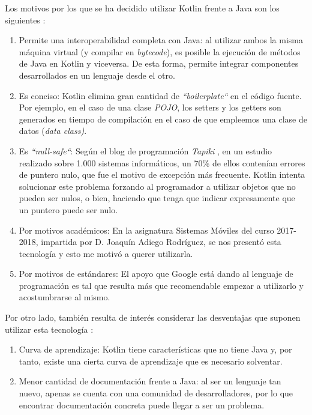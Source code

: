 \documentclass[twoside]{report}
\begin{document}
Los motivos por los que se ha decidido utilizar Kotlin frente a Java son los siguientes \cite{kotlin}:
\begin{enumerate}

\item Permite una interoperabilidad completa con Java: al utilizar ambos la misma máquina virtual (y compilar en \textit{bytecode}), es posible la ejecución de métodos de Java en Kotlin y viceversa. De esta forma, permite integrar componentes desarrollados en un lenguaje desde el otro.

\item Es conciso: Kotlin elimina gran cantidad de \textit{“boilerplate“} en el código fuente. Por ejemplo, en el caso de una clase \textit{POJO}, los setters y los getters son generados en tiempo de compilación en el caso de que empleemos una clase de datos (\textit{data class)}.

\item Es \textit{“null-safe“}: Según el blog de programación \textit{Tapiki} \cite{tapikinull}, en un estudio realizado sobre 1.000 sistemas informáticos, un 70\% de ellos contenían errores de puntero nulo, que fue el motivo de excepción más frecuente. Kotlin intenta solucionar este problema forzando al programador a utilizar objetos que no pueden ser nulos, o bien, haciendo que tenga que indicar expresamente que un puntero puede ser nulo.

\item Por motivos académicos: En la asignatura Sistemas Móviles \cite{smovkotlin} del curso 2017-2018, impartida por D. Joaquín Adiego Rodríguez, se nos presentó esta tecnología y esto me motivó a querer utilizarla.

\item Por motivos de estándares: El apoyo que Google está dando al lenguaje de programación es tal que resulta más que recomendable empezar a utilizarlo y acostumbrarse al mismo.
\end{enumerate}

Por otro lado, también resulta de interés considerar las desventajas que suponen utilizar esta tecnología \cite{disadvKotlin}:
\begin{enumerate}

\item Curva de aprendizaje: Kotlin tiene características que no tiene Java y, por tanto, existe una cierta curva de aprendizaje que es necesario solventar.

\item Menor cantidad de documentación frente a Java: al ser un lenguaje tan nuevo, apenas se cuenta con una comunidad de desarrolladores, por lo que encontrar documentación concreta puede llegar a ser un problema.
\end{enumerate}
\end{document}
